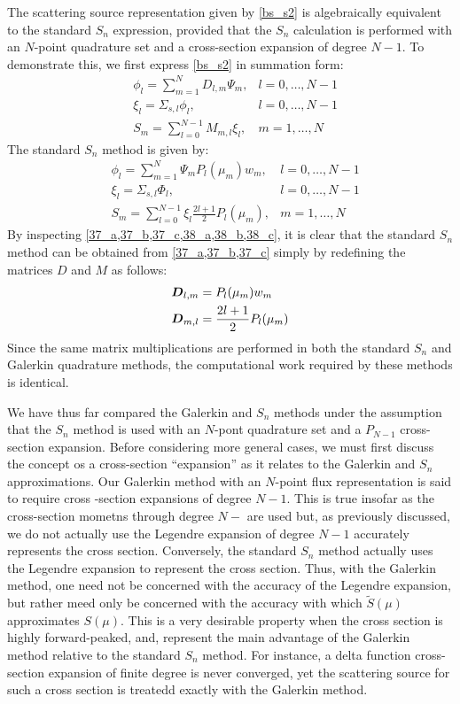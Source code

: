 The scattering source representation given by \cref{bs_s2} is
algebraically equivalent to the standard $S_n$ expression, provided that the
$S_n$ calculation is performed with an $N$-point quadrature set and a
cross-section expansion of degree $N-1$. To demonstrate this, we first express
\cref{bs_s2} in summation form:
\begin{align}
&\phi_l = \sum_{m=1}^N D_{l,m} \Psi_m, & l=0,\hdots,N-1 \label{37_a}\\
&\xi_l = \Sigma_{s,l} \phi_l, & l=0,\hdots,N-1 \label{37_b}\\
&S_m = \sum_{l=0}^{N-1} M_{m,l}\xi_l, & m=1,\hdots,N \label{37_c}
\end{align}
The standard $S_n$ method is given by:
\begin{align}
&\phi_l = \sum_{m=1}^N \Psi_m P_l(\mu_m) w_m, & l=0,\hdots,N-1 \label{38_a}\\
&\xi_l = \Sigma_{s,l} \Phi_l, & l=0,\hdots, N-1 \label{38_b} \\
&S_m = \sum_{l=0}^{N-1}\xi_l \frac{2l+1}{2}P_l(\mu_m), & m=1,\hdots,N
\label{38_c}
\end{align}
By inspecting \cref{37_a,37_b,37_c,38_a,38_b,38_c}, it is clear that the
standard $S_n$ method can be obtained from \cref{37_a,37_b,37_c} simply by
redefining the matrices $D$ and $M$ as follows:
\begin{align}
& \bs{D}_{l,m} = P_l(\mu_m) w_m \label{39_a}\\
& \bs{D}_{m,l} = \frac{2l+1}{2} P_l(\mu_m) \label{39_b}
\end{align}
Since the same matrix multiplications are performed in both the standard
$S_n$ and Galerkin quadrature methods, the computational work required by
these methods is identical.

We have thus far compared the Galerkin and $S_n$ methods under the assumption
that the $S_n$ method is used with an $N$-pont quadrature set and a $P_{N-1}$
cross-section expansion. Before considering more general cases, we must first
discuss the concept os a cross-section ``expansion'' as it relates to the
Galerkin and $S_n$ approximations. Our Galerkin method with an $N$-point flux
representation is said to require cross -section expansions of degree $N-1$.
This is true insofar as the cross-section mometns through degree $N-$ are used
but, as previously discussed, we do not actually use the Legendre expansion of
degree $N-1$ accurately represents the cross section. Conversely, the standard
$S_n$ method actually uses the Legendre expansion to represent the cross
section. Thus, with the Galerkin method, one need not be concerned with the
accuracy of the Legendre expansion, but rather meed only be concerned with the
accuracy with which $\tilde{S}(\mu)$ approximates $S(\mu)$. This is a very
desirable property when the cross section is highly forward-peaked, and,
represent the main advantage of the Galerkin method relative to the standard
$S_n$ method. For instance, a delta function cross-section expansion of finite
degree is never converged, yet the scattering source for such a cross section
is treatedd exactly with the Galerkin method.

